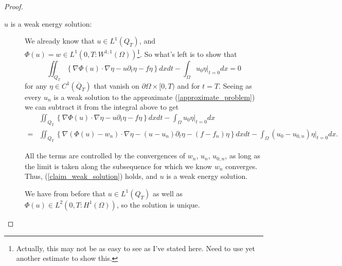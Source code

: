 \documentclass[11pt, a4paper]{article}
\begin{document}
\begin{proof}
\begin{description}
	\item[$u$ is a weak energy solution:] We already know that $u \in L^1(Q_T)$, and $\Phi(u)=w \in L^1(0,T: W^{1,1}(\Omega))$\footnote{Actually, this may not be as easy to see as I've stated here. Need to use yet another estimate to show this.}. So what's left is to show that
	\begin{equation}
	\label{claim_weak_solution}
	\iint_{Q_T}\left\{ \nabla\Phi(u) \cdot \nabla \eta - u\partial_t \eta - f\eta \right\}dxdt - \int_\Omega u_0\eta\big|_{t=0}dx = 0
	\end{equation}
	for any $\eta \in C^1(\overline{Q}_T)$ that vanish on $\partial \Omega \times [0,T)$ and for $t=T$. Seeing as every $u_n$ is a weak solution to the approximate (\ref{approximate_problem}) we can subtract it from the integral above to get
	\begin{align*}
	&\iint_{Q_T}\left\{ \nabla\Phi(u) \cdot \nabla \eta - u\partial_t \eta - f\eta \right\}dxdt - \int_\Omega u_0\eta\big|_{t=0}dx \\
	= &\iint_{Q_T}\left\{ \nabla(\Phi(u)-w_n) \cdot \nabla \eta - (u-u_n)\partial_t \eta - (f-f_n)\eta \right\}dxdt - \int_\Omega (u_0-u_{0,n})\eta\big|_{t=0}dx.
	\end{align*}
	
	All the terms are controlled by the convergences of $w_n$, $u_n$, $u_{0,n}$, as long as the limit is taken along the subsequence for which we know $w_n$ converges. Thus, (\ref{claim_weak_solution}) holds, and $u$ is a weak energy solution.
	
	We have from before that $u\in L^1(Q_T)$ as well as $\Phi(u) \in L^2(0,T: H^1(\Omega))$, so the solution is unique.
	

\end{description}
\end{proof}
\end{document}
